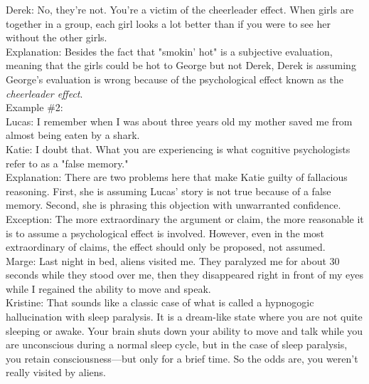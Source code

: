 \documentclass[a4paper,12pt,single,pdftex]{scrbook}
\begin{document}
    
      Derek: No, they're not. You're a victim of the cheerleader effect. When girls are together in a group, each girl looks a lot better than if you were to see her without the other girls.
    \\

    
      Explanation: Besides the fact that "smokin' hot" is a subjective evaluation, meaning that the girls could be hot to George but not Derek, Derek is assuming George's evaluation is wrong because of the psychological effect known as the {\it cheerleader effect}.
    \\

    
      Example \#2:
    \\

    
      Lucas: I remember when I was about three years old my mother saved me from almost being eaten by a shark.
    \\

    
      Katie: I doubt that. What you are experiencing is what cognitive psychologists refer to as a "false memory."
    \\

    
      Explanation: There are two problems here that make Katie guilty of fallacious reasoning. First, she is assuming Lucas' story is not true because of a false memory. Second, she is phrasing this objection with unwarranted confidence.
    \\

    
      Exception: The more extraordinary the argument or claim, the more reasonable it is to assume a psychological effect is involved. However, even in the most extraordinary of claims, the effect should only be proposed, not assumed.
    \\

    
      Marge: Last night in bed, aliens visited me. They paralyzed me for about 30 seconds while they stood over me, then they disappeared right in front of my eyes while I regained the ability to move and speak.
    \\

    
      Kristine: That sounds like a classic case of what is called a hypnogogic hallucination with sleep paralysis. It is a dream-like state where you are not quite sleeping or awake. Your brain shuts down your ability to move and talk while you are unconscious during a normal sleep cycle, but in the case of sleep paralysis, you retain consciousness—but only for a brief time. So the odds are, you weren't really visited by aliens.
    \\
\end{document}
